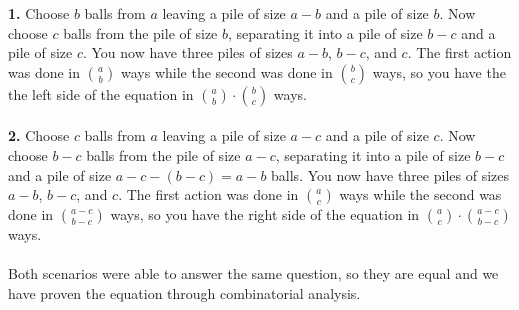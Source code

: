 \documentclass[12pt,letterpaper]{cos340hw}
\begin{document}
\textbf{1.} Choose $b$ balls from $a$ leaving a pile of size $a-b$ and a pile of size $b$. Now choose $c$ balls from the 
pile of size $b$, separating it into a pile of size $b-c$ and a pile of size $c$. You now have three piles of sizes $a-b$, $b-c$, and $c$. 
The first action was done in $\binom{a}{b}$ ways while the second was done in $\binom{b}{c}$ ways, so you have the the left side of the equation
in $\binom{a}{b}\cdot\binom{b}{c}$ ways.\\\\
\textbf{2.} Choose $c$ balls from $a$ leaving a pile of size $a-c$ and a pile of size $c$. Now choose $b-c$ balls from the pile of size $a-c$, 
separating it into a pile of size $b-c$ and a pile of size $a-c-(b-c)=a-b$ balls. You now have three piles of sizes $a-b$, $b-c$, and $c$. 
The first action was done in $\binom{a}{c}$ ways while the second was done in $\binom{a-c}{b-c}$ ways, so you have the right side of the equation 
in $\binom{a}{c}\cdot\binom{a-c}{b-c}$ ways.\\\\
Both scenarios were able to answer the same question, so they are equal and we have proven the equation through combinatorial analysis.

\end{document}
